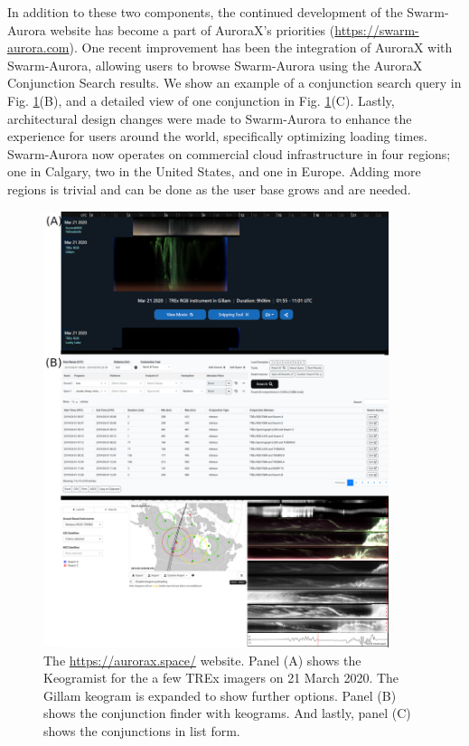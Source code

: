 \documentclass[utf8]{FrontiersinHarvard} %
\begin{document}
In addition to these two components, the continued development of the Swarm-Aurora website has become a part of AuroraX’s priorities (\url{https://swarm-aurora.com}). One recent improvement has been the integration of AuroraX with Swarm-Aurora, allowing users to browse Swarm-Aurora using the AuroraX Conjunction Search results. We show an example of a conjunction search query in Fig. \ref{fig1}(B), and a detailed view of one conjunction in Fig. \ref{fig1}(C). Lastly, architectural design changes were made to Swarm-Aurora to enhance the experience for users around the world, specifically optimizing loading times. Swarm-Aurora now operates on commercial cloud infrastructure in four regions; one in Calgary, two in the United States, and one in Europe. Adding more regions is trivial and can be done as the user base grows and are needed.


\begin{figure}
    \centering
    \includegraphics[width=0.9\textwidth]{figures/fig1.jpg}
    \caption{The \url{https://aurorax.space/} website. Panel (A) shows the Keogramist for the a few TREx imagers on 21 March 2020. The Gillam keogram is expanded to show further options. Panel (B) shows the conjunction finder with keograms. And lastly, panel (C) shows the conjunctions in list form.}
    \label{fig1}
\end{figure}
\end{document}
